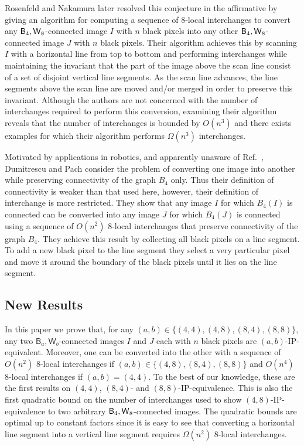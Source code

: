 \documentclass[lotsofwhite,charterfonts]{patmorin}
\newcommand{\foureight}{\ensuremath{\protect\textup{\textsf{B}}_{4},\protect\textup{\textsf{W}}_{8}}}
\begin{document}
Rosenfeld and Nakamura \cite{rn02} later resolved this conjecture in
the affirmative by giving an algorithm for computing a sequence of
$8$-local interchanges to convert any \foureight-connected image $I$ with $n$
black pixels into any other \foureight-connected image $J$ with $n$
black pixels. Their algorithm achieves this by scanning $I$ with a
horizontal line from top to bottom and performing interchanges while
maintaining the invariant that the part of the image above the scan line
consist of a set of disjoint vertical line segments. As the scan line
advances, the line segments above the scan line are moved and/or
merged in order to preserve this invariant.   Although the authors are
not concerned with the number of interchanges required to perform this
conversion, examining their algorithm reveals that the number of
interchanges is bounded by $O(n^3)$ and there exists examples for
which their algorithm performs $\Omega(n^3)$ interchanges.

Motivated by applications in robotics, and apparently unaware of
Ref.~\cite{rn02}, Dumitrescu and Pach \cite{dp04} consider the problem
of converting one image into another while preserving connectivity of
the graph $B_4$ only.  Thus their definition of connectivity is weaker than that used here, however, their definition of interchange is more restricted. They show that any image $I$ for
which $B_4(I)$ is connected can be converted into any image $J$ for
which $B_4(J)$ is connected using a sequence of $O(n^2)$ 8-local
interchanges that preserve connectivity of the graph
$B_4$. They achieve this result by collecting all black
pixels on a line segment.  To add a new black pixel to the line
segment they select a very particular pixel and move it around the
boundary of the black pixels until it lies on the line segment.

\subsection{New Results}

In this paper we prove that, for any $(a,b)\in\{(4,4),(4,8),(8,4),(8,8)\}$,
any two $\textsf{B}_a,\textsf{W}_b$-connected images $I$ and $J$ each with $n$ black pixels are $(a,b)$-IP-equivalent. Moreover, one can be converted into the other with a sequence of $O(n^2)$ 8-local interchanges if $(a,b)\in\{(4,8),(8,4),(8,8)\}$ and $O(n^4)$ 8-local interchanges if $(a,b)=(4,4)$. To the best of
our knowledge, these are the first results on $(4,4)$, $(8,4)$- and
$(8,8)$-IP-equivalence. This is also the first quadratic bound on the
number of interchanges used to show $(4,8)$-IP-equivalence to two
arbitrary \foureight-connected images.  The quadratic bounds are optimal up to
constant factors since it is easy to see that converting a horizontal
line segment into a vertical line segment requires $\Omega(n^2)$
8-local interchanges.
\end{document}
